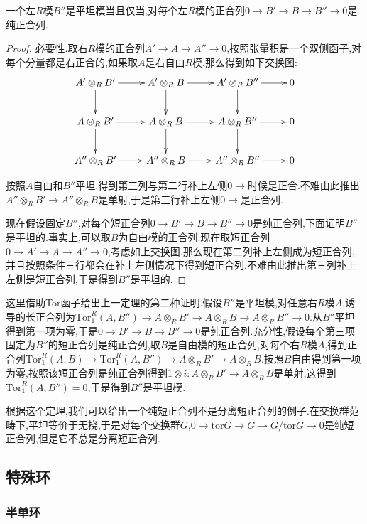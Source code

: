 一个左$R$模$B''$是平坦模当且仅当,对每个左$R$模的正合列$0\to B'\to B\to B''\to0$是纯正合列.
\begin{proof}
	
	必要性.取右$R$模的正合列$A'\to A\to A''\to 0$,按照张量积是一个双侧函子,对每个分量都是右正合的,如果取$A$是右自由$R$模,那么得到如下交换图:
	$$\xymatrix{
		A'\otimes_RB'\ar[r]\ar[d]&A'\otimes_RB\ar[r]\ar[d]&A'\otimes_RB''\ar[r]\ar[d]&0\\
		A\otimes_RB'\ar[r]\ar[d]&A\otimes_RB\ar[r]\ar[d]&A\otimes_RB''\ar[r]\ar[d]&0\\
		A''\otimes_RB'\ar[r]&A''\otimes_RB\ar[r]&A''\otimes_RB''\ar[r]&0
	}$$
	
	按照$A$自由和$B''$平坦,得到第三列与第二行补上左侧$0\to$时候是正合.不难由此推出$A''\otimes_RB'\to A''\otimes_RB$是单射,于是第三行补上左侧$0\to$是正合列.
	
	现在假设固定$B''$,对每个短正合列$0\to B'\to B\to B''\to0$是纯正合列,下面证明$B''$是平坦的.事实上,可以取$B$为自由模的正合列.现在取短正合列$0\to A'\to A\to A''\to0$,考虑如上交换图.那么现在第二列补上左侧成为短正合列,并且按照条件三行都会在补上左侧情况下得到短正合列.不难由此推出第三列补上左侧是短正合列,于是得到$B''$是平坦的.
\end{proof}

这里借助Tor函子给出上一定理的第二种证明.假设$B''$是平坦模,对任意右$R$模$A$,诱导的长正合列为$\mathrm{Tor}_1^R(A,B'')\to A\otimes_RB'\to A\otimes_RB\to A\otimes_RB''\to0$.从$B''$平坦得到第一项为零,于是$0\to B'\to B\to B''\to0$是纯正合列.充分性,假设每个第三项固定为$B''$的短正合列是纯正合列,取$B$是自由模的短正合列,对每个右$R$模$A$,得到正合列$\mathrm{Tor}_1^R(A,B)\to\mathrm{Tor}_1^R(A,B'')\to A\otimes_RB'\to A\otimes_RB$.按照$B$自由得到第一项为零,按照该短正合列是纯正合列得到$1\otimes i:A\otimes_RB'\to A\otimes_RB$是单射,这得到$\mathrm{Tor}_1^R(A,B'')=0$,于是得到$B''$是平坦模.

根据这个定理,我们可以给出一个纯短正合列不是分离短正合列的例子.在交换群范畴下,平坦等价于无挠,于是对每个交换群$G$,$0\to\mathrm{tor}G\to G\to G/\mathrm{tor}G\to0$是纯短正合列,但是它不总是分离短正合列.

\newpage
\subsection{特殊环}
\subsubsection{半单环}

